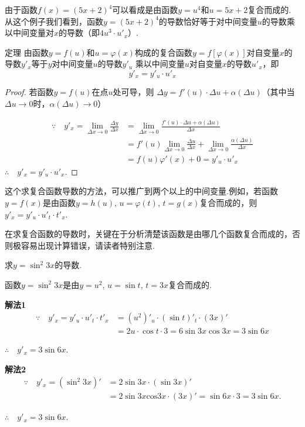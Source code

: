 由于函数$f(x)=(5x+2)^4$可以看成是由函数$y=u^4$和$u=5x+2$复合而成的. 从这个例子我们看到，函数$y=(5x+2)^4$的导数恰好等于对中间变量$u$的导数乘以中间变量对$x$的导数（即$4u^3\cdot u'_x$）.

\begin{thm}
{定理} 由函数$y=f(u)$和$u=\varphi(x)$构成的复合函数$y=f[\varphi(x)]$对自变量$x$的导数$y'_x$等于$y$对中间变量$u$的导数$y'_u$ 乘以中间变量$u$对自变量$x$的导数$u'_x$，即
\[y'_x=y'_u\cdot u'_x\]    
\end{thm}

\begin{proof}
若函数$y=f(u)$在点$u$处可导，则
    $\Delta y=f' \left(u\right)\cdot \Delta u+\alpha\left(\Delta u\right)$（其中当$\Delta u\to0$时，$\alpha(\Delta u)\to0$）

\[\begin{split}
    \because\quad y'_x=\lim_{\Delta x\to0}\frac{\Delta y}{\Delta x}&=\lim_{\Delta x\to0}\frac{f' (u)\cdot\Delta u+\alpha(\Delta u)}{\Delta x}\\
    &=f' \left(u\right)\lim_{\Delta x\to0}\frac{\Delta u}{\Delta x}+\lim_{\Delta x\to0}\frac{\alpha\left(\Delta u\right)}{\Delta x}\\
    &=f(u)\varphi' (x)+0=y'_{u}\cdot  u'_{x}
\end{split}\]
$\therefore\quad y'_x=y'_{u}\cdot  u'_{x}$.
\end{proof}

\begin{rmk}
这个求复合函数导数的方法，可以推广到两个以上的中间变量.例如，若函数$y=f(x)$是由函数$y=h(u)$, $u=\varphi(t)$, $t=g(x)$复合而成的，则$y'_x=y'_u\cdot u'_t\cdot t'_x$.
\end{rmk}

在求复合函数的导数时，关键在于分析清楚该函数是由哪几个函数复合而成的，否则极容易出现计算错误，请读者特别注意.

\begin{example}
    求$y=\sin^2 3x$的导数.
\end{example}

\begin{analyze}
函数$y=\sin^2 3x$是由$y=u^2$, $u=\sin t$, $t=3x$复合而成的.
\end{analyze}

\begin{solution}
\textbf{解法1} 
\[\begin{split}
    \because\quad y'_x=y'_u\cdot u'_t\cdot t'_x &=(u^2)'_u\cdot (\sin t)'_t\cdot (3x)'\\
    &=2u\cdot \cos t\cdot 3 =6\sin 3x\cos 3x=3\sin 6x
\end{split}\]

$\therefore\quad y'_x=3\sin 6x$.

\textbf{解法2}
\[\begin{split}
    \because \quad y' _{x}=(\sin^{2}3x)' &=2\sin3x\cdot (\sin 3x)' \\
    &=2\sin 3x\mathrm{cos}3x\cdot (3x)' =\sin 6x\cdot 3 =3\sin 6x.
\end{split}\]

$\therefore\quad y'_x=3\sin 6x$.
\end{solution}

